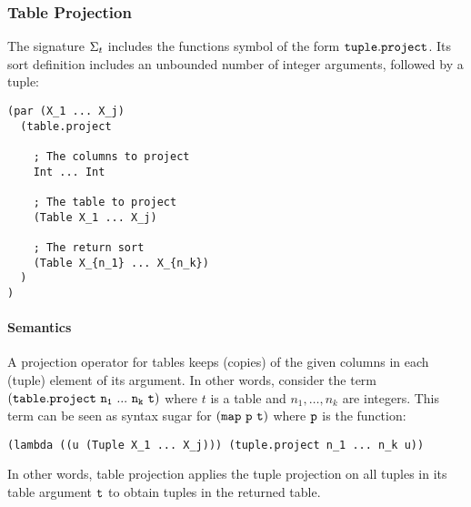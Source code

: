 \documentclass[english,a4paper,10pt]{article}
\begin{document}
\subsubsection{Table Projection}
The signature $\Sigma_{t}$ includes 
the functions symbol of the form
${\tt tuple.project}$.
Its sort definition includes an unbounded number of integer arguments, followed
by a tuple:
\begin{verbatim}
(par (X_1 ... X_j) 
  (table.project
  
    ; The columns to project
    Int ... Int
  
    ; The table to project
    (Table X_1 ... X_j)
    
    ; The return sort
    (Table X_{n_1} ... X_{n_k})
  )
)
\end{verbatim}

\paragraph{Semantics}

A projection operator for tables keeps (copies) of the given columns
in each (tuple) element of its argument.
In other words,
consider the term $\syntax{(table.project\ n_1\ ...\ n_k\ t)}$
where $t$ is a table and $n_1, \ldots, n_k$ are integers.
This term
can be seen as syntax sugar for ${\tt (map\ p\ t)}$ where ${\tt p}$
is the function:
\begin{verbatim}
(lambda ((u (Tuple X_1 ... X_j))) (tuple.project n_1 ... n_k u))
\end{verbatim}
In other words, table projection
applies the tuple projection on all tuples in its table argument ${\tt t}$
to obtain tuples in the returned table.
\end{document}
